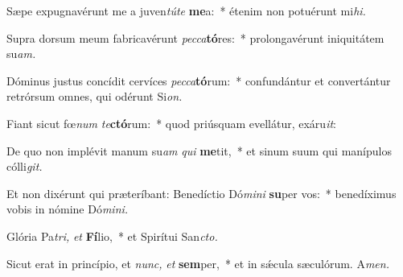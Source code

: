 \item Sæpe expugnavérunt me a juven\textit{túte} \textbf{me}a:~* étenim non potuérunt mi\textit{hi.}
\item Supra dorsum meum fabricavérunt \textit{pecca}\textbf{tó}res:~* prolongavérunt iniquitátem su\textit{am.}
\item Dóminus justus concídit cervíces \textit{pecca}\textbf{tó}rum:~* confundántur et convertántur retrórsum omnes, qui odérunt Si\textit{on.}
\item Fiant sicut fœ\textit{num} \textit{te}\textbf{ctó}rum:~* quod priúsquam evellátur, exáru\textit{it}:
\item De quo non implévit manum su\hspace*{0.03em}\textit{am} \textit{qui} \textbf{me}tit,~* et sinum suum qui manípulos cólli\hspace*{0.03em}\textit{git.}
\item Et non dixérunt qui præteríbant: Benedíctio Dó\textit{mini} \textbf{su}per vos:~* benedíximus vobis in nómine  Dó\textit{mini.}
\item Glória  Pa\hspace*{0.03em}\textit{tri,} \textit{et} \textbf{Fí}lio,~* et Spirítui San\hspace*{0.03em}\textit{cto.}
\item Sicut erat in princípio, et \textit{nunc,} \textit{et} \textbf{sem}per,~* et in sǽcula sæculórum. A\textit{men.}